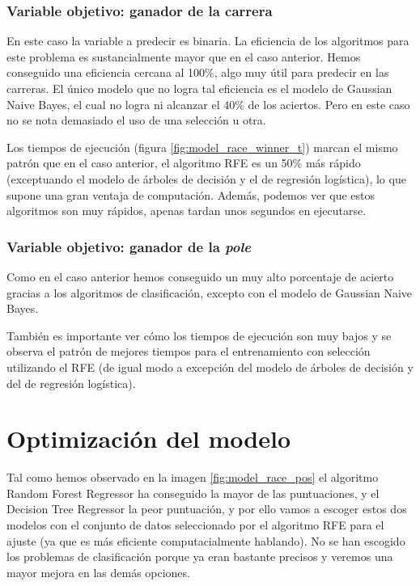 \subsubsection{Variable objetivo: ganador de la carrera}
En este caso la variable a predecir es binaria. La eficiencia de los algoritmos para este problema es sustancialmente mayor que en el caso anterior. Hemos conseguido una eficiencia cercana al 100\%, algo muy útil para predecir en las carreras. El único modelo que no logra tal eficiencia es el modelo de Gaussian Naive Bayes, el cual no logra ni alcanzar el 40\% de los aciertos. Pero en este caso no se nota demasiado el uso de una selección u otra.

Los tiempos de ejecución (figura \ref{fig:model_race_winner_t}) marcan el mismo patrón que en el caso anterior, el algoritmo RFE es un 50\% más rápido (exceptuando el modelo de árboles de decisión y el de regresión logística), lo que supone una gran ventaja de computación. Además, podemos ver que estos algoritmos son muy rápidos, apenas tardan unos segundos en ejecutarse.


\subsubsection{Variable objetivo: ganador de la \textit{pole}}
Como en el caso anterior hemos conseguido un muy alto porcentaje de acierto gracias a los algoritmos de clasificación, excepto con el modelo de Gaussian Naive Bayes.

También es importante ver cómo los tiempos de ejecución son muy bajos y se observa el patrón de mejores tiempos para el entrenamiento con selección utilizando el RFE (de igual modo a excepción del modelo de árboles de decisión y del de regresión logística).


\section{Optimización del modelo}
Tal como hemos observado en la imagen \ref{fig:model_race_pos} el algoritmo Random Forest Regressor ha conseguido la mayor de las puntuaciones, y el Decision Tree Regressor la peor puntuación, y por ello vamos a escoger estos dos modelos con el conjunto de datos seleccionado por el algoritmo RFE para el ajuste (ya que es más eficiente computacialmente hablando). No se han escogido los problemas de clasificación porque ya eran bastante precisos y veremos una mayor mejora en las demás opciones. 

